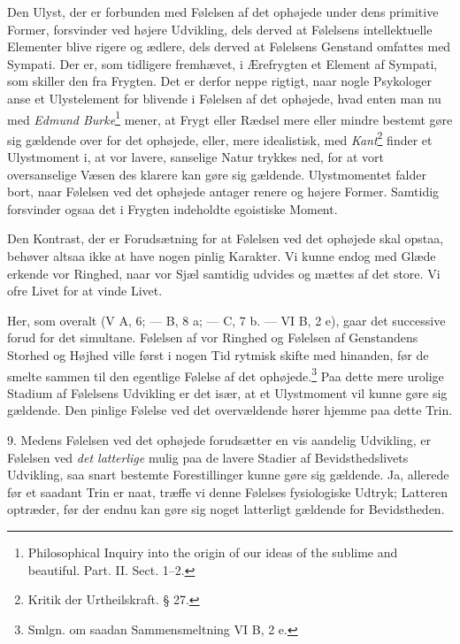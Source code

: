\documentclass[12pt,a4paper,openany]{book}
\newcommand{\opage}[1]{\marginnote{\footnotesize\textit{[#1]}}}
\begin{document}
Den Ulyst, der er forbunden med Følelsen af det ophøjede under dens
primitive Former, forsvinder ved højere Udvikling, dels derved at
Følelsens intellektuelle Elementer blive rigere og ædlere, dels derved
at Følelsens Genstand omfattes med Sympati. Der er, som tidligere
fremhævet, i Ærefrygten et Element af Sympati, som skiller den fra
Frygten. Det er derfor neppe rigtigt, naar nogle Psykologer anse et
Ulystelement for blivende i Følelsen af det ophøjede, hvad enten man nu
med \emph{Edmund Burke}\footnote[2]{Philosophical Inquiry into the
origin of our ideas of the sublime and beautiful. Part. II. Sect. 1--2.}
mener, at Frygt eller
\opage{343}Rædsel mere eller mindre bestemt gøre sig gældende over for
det ophøjede, eller, mere idealistisk, med
\emph{Kant}\footnote[1]{Kritik der Urtheilskraft. § 27.} finder et
Ulystmoment i, at vor lavere, sanselige Natur trykkes ned, for at vort
oversanselige Væsen des klarere kan gøre sig gældende. Ulystmomentet
falder bort, naar Følelsen ved det ophøjede antager renere og højere
Former. Samtidig forsvinder ogsaa det i Frygten indeholdte egoistiske
Moment.

Den Kontrast, der er Forudsætning for at Følelsen ved det ophøjede skal
opstaa, behøver altsaa ikke at have nogen pinlig Karakter. Vi kunne
endog med Glæde erkende vor Ringhed, naar vor Sjæl samtidig udvides og
mættes af det store. Vi ofre Livet for at vinde Livet.

Her, som overalt (V A, 6; --- B, 8 a; --- C, 7 b. --- VI B, 2 e), gaar
det successive forud for det simultane. Følelsen af vor Ringhed og
Følelsen af Genstandens Storhed og Højhed ville først i nogen Tid
rytmisk skifte med hinanden, før de smelte sammen til den egentlige
Følelse af det ophøjede.\footnote[2]{Smlgn. om saadan Sammensmeltning VI
B, 2 e.} Paa dette mere urolige Stadium af Følelsens Udvikling er det
især, at et Ulystmoment vil kunne gøre sig gældende. Den pinlige Følelse
ved det overvældende hører hjemme paa dette Trin.

9. Medens Følelsen ved det ophøjede forudsætter en vis aandelig
Udvikling, er Følelsen ved \emph{det latterlige} mulig paa de lavere
Stadier af Bevidsthedslivets Udvikling, saa snart bestemte
Forestillinger kunne gøre sig gældende. Ja, allerede før et saadant Trin
er naat, træffe vi denne Følelses fysiologiske Udtryk; Latteren
optræder, før der endnu kan gøre sig noget latterligt gældende for
Bevidstheden.
\end{document}
